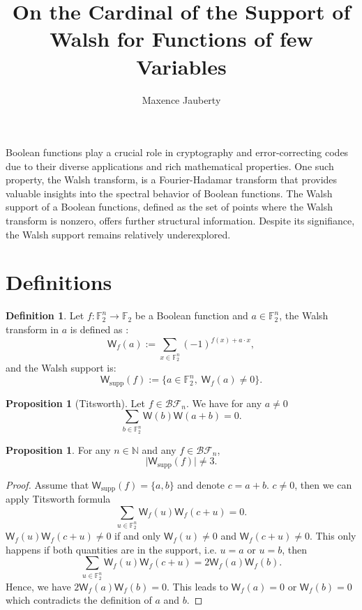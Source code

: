 \documentclass[12pt]{article}
\title{On the Cardinal of the Support of Walsh for Functions of few Variables}
\author{Maxence Jauberty}
\theoremstyle{definition}
\newtheorem{definition}[theorem]{Definition}
\newtheorem{proposition}[theorem]{Proposition}
\newcommand{\F}{\mathbb{F}}
\newcommand{\W}{\mathsf{W}}
\begin{document}
\maketitle
Boolean functions play a crucial role in cryptography and error-correcting codes due to their
diverse applications and rich mathematical properties. One such property, the Walsh 
transform, is a Fourier-Hadamar transform that provides valuable insights into the 
spectral behavior of Boolean functions. The Walsh support of a Boolean functions, defined 
as the set of points where the Walsh transform is nonzero, offers further structural information.
Despite its signifiance, the Walsh support remains relatively underexplored.
\section{Definitions}
\begin{definition} Let \(f : \F^n_2 \to \F_2\) be a Boolean function and \(a\in \F_2^n\), 
    the Walsh transform in \(a\) is defined as :
    \begin{equation*}
        \W_f(a) := \sum_{x\in\F_2^n}(-1)^{f(x)+a\cdot x},
    \end{equation*}
    and the Walsh support is:
    \begin{equation*}
        \W_{\mathrm{supp}}(f) := \{a\in \F_2^n,\;\W_f(a)\neq 0\}.
    \end{equation*}
\end{definition}
\begin{proposition}[Titsworth] Let \(f\in \mathcal{BF}_n\). We have for any \(a\neq 0\)
    \begin{equation}
        \sum_{b\in \F_2^n} \W(b)\W(a+b) = 0.
    \end{equation}
\end{proposition}
\begin{proposition} For any \(n\in\mathbb{N}\) and any \(f\in\mathcal{BF}_n\), 
    \begin{equation*}
        \lvert \W_{\mathrm{supp}}(f) \rvert \neq 3.
    \end{equation*}
\end{proposition}
\begin{proof}
    Assume that \( \W_{\mathrm{supp}}(f) = \{a,b\}\) and denote \(c = a+b\). \(c\neq 0\), 
    then we can apply Titsworth formula
    \begin{equation*}
        \sum_{u\in \F_2^n} \W_f(u)\W_f(c+u) = 0.
    \end{equation*}
    \(\W_f(u)\W_f(c+u)\neq 0\) if and only \(\W_f(u)\neq 0\) and \(\W_f(c+u)\neq 0\). This only happens 
    if both quantities are in the support, i.e. \(u = a\) or \(u=b\), then
    \begin{equation*}
        \sum_{u\in \F_2^n} \W_f(u)\W_f(c+u) = 2\W_f(a)\W_f(b).
    \end{equation*}
    Hence, we have \(2\W_f(a)\W_f(b) = 0\). This leads to \(\W_f(a) = 0\) or \(\W_f(b) = 0\) which 
    contradicts the definition of \(a\) and \(b\).
\end{proof}
\end{document}
